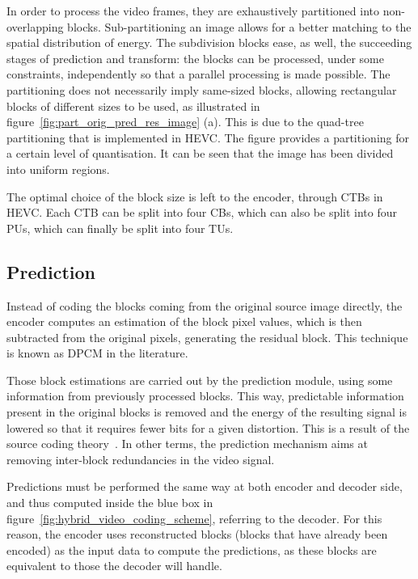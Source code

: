 \documentclass[11pt,a4paper,openright,twoside]{book}
\numberwithin{equation}{section} %
\numberwithin{figure}{section} %
\numberwithin{table}{section} %
\begin{document}
In order to process the video frames, they are exhaustively partitioned into
non-overlapping blocks.
Sub-partitioning an image allows for a better matching to the spatial
distribution of energy.
The subdivision blocks ease, as well,  the succeeding stages of prediction and
transform:
the blocks can be processed, under some constraints, independently so that a
parallel processing is made possible.
The partitioning does not necessarily imply same-sized blocks, allowing
rectangular blocks of different sizes to be used, as illustrated in
figure~\ref{fig:part_orig_pred_res_image} (a).
This is due to the quad-tree partitioning that is implemented in \ac{HEVC}.
The figure provides a partitioning for a certain level of quantisation.
It can be seen that the image has been divided into uniform regions.

The optimal choice of the block size is left to the encoder, through \acp{CTB}
in \ac{HEVC}.
Each \ac{CTB} can be split into four \acp{CB}, which can also be split into
four \acp{PU}, which can finally be split into four \acp{TU}.

\subsection{Prediction}
\label{sub:prediction}

Instead of coding the blocks coming from the original source image directly,
the encoder computes an estimation of the block pixel values, which is then
subtracted from the original pixels, generating the residual block.
This technique is known as \ac{DPCM} in the literature.

Those block estimations are carried out by the prediction module, using some
information from previously processed blocks.
This way, predictable information present in the original blocks is removed
and the energy of the resulting signal is lowered so that it requires fewer
bits for a given distortion.
This is a result of the source coding
theory~\cite{jayant-84-digital-coding-waveforms}.
In other terms, the prediction mechanism aims at removing inter-block
redundancies in the video signal.

Predictions must be performed the same way at both encoder and decoder side,
and thus computed inside the blue box in
figure~\ref{fig:hybrid_video_coding_scheme}, referring to the decoder.
For this reason, the encoder uses reconstructed blocks (blocks that have
already been encoded) as the input data to compute the predictions, as these
blocks are equivalent to those the decoder will handle.
\end{document}
